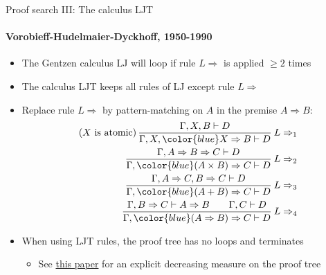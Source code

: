 \documentclass[english]{beamer}
\begin{document}
\begin{frame}{Proof search III: The calculus LJT}


\framesubtitle{Vorobieff-Hudelmaier-Dyckhoff, 1950-1990}
\begin{itemize}
\item The Gentzen calculus LJ will loop if rule $L\Rightarrow$ is applied
$\geq2$ times
\item The calculus LJT keeps all rules of LJ except rule $L\Rightarrow$
\item Replace rule $L\Rightarrow$ by pattern-matching on $A$ in the premise
$A\Rightarrow B$:
\begin{align*}
\text{(}X\text{ is atomic)\,}\frac{\Gamma,X,B\vdash D}{\Gamma,X,{\color{blue}X\Rightarrow B}\vdash D}\:L\Rightarrow_{1}\\
\frac{\Gamma,A\Rightarrow B\Rightarrow C\vdash D}{\Gamma,{\color{blue}(A\times B)\Rightarrow C}\vdash D}\:L\Rightarrow_{2}\\
\frac{\Gamma,A\Rightarrow C,B\Rightarrow C\vdash D}{\Gamma,{\color{blue}(A+B)\Rightarrow C}\vdash D}\:L\Rightarrow_{3}\\
\frac{\Gamma,B\Rightarrow C\vdash A\Rightarrow B\quad\quad\Gamma,C\vdash D}{\Gamma,{\color{blue}(A\Rightarrow B)\Rightarrow C}\vdash D}\:L\Rightarrow_{4}
\end{align*}
\item When using LJT rules, the proof tree has no loops and terminates
\begin{itemize}
\item See \href{http://citeseer.ist.psu.edu/viewdoc/summary?doi=10.1.1.35.2618}{this paper}
for an explicit decreasing measure on the proof tree
\end{itemize}
\end{itemize}
\end{frame}
\end{document}

